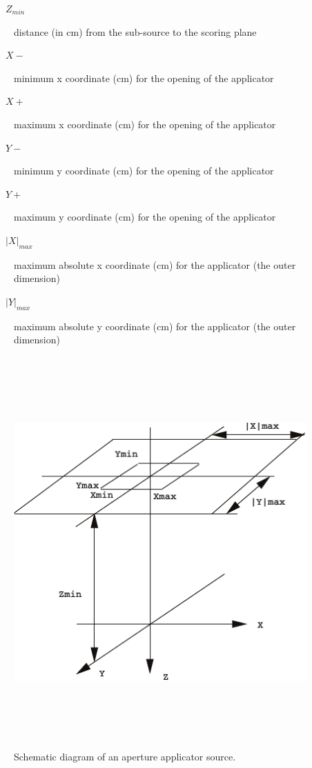 \documentclass[12pt,twoside]{article}
\begin{document}
\begin{description}
\item [~~~~$Z_{min}$] distance (in cm) from the sub-source to the scoring plane
\item [~~~~$X-$] minimum x coordinate (cm) for the opening of the applicator
\item [~~~~$X+$] maximum x coordinate (cm) for the opening of the applicator
\item [~~~~$Y-$] minimum y coordinate (cm) for the opening of the applicator
\item [~~~~$Y+$] maximum y coordinate (cm) for the opening of the applicator
\item [~~~~$|X|_{max}$] maximum absolute x coordinate (cm) for the applicator (the outer dimension)
\item [~~~~$|Y|_{max}$] maximum absolute y coordinate (cm) for the applicator (the outer dimension)
\end{description}

\begin{figure}[htbp]
\begin{center}
\includegraphics[height=15cm]{figures/source1}
\caption[]
{Schematic diagram of an aperture applicator source. }
\label{source1}
\end{center}
\end{figure}
\end{document}
